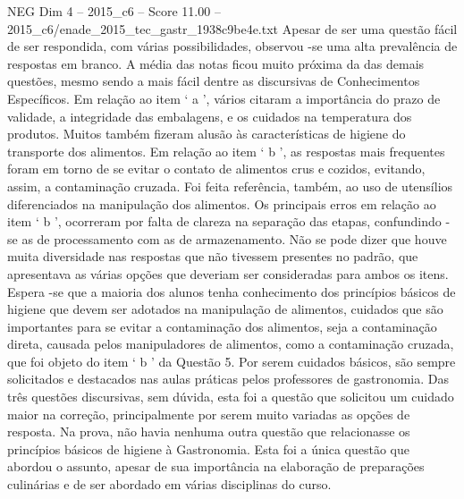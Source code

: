 \begin{textsample}{NEG Dim 4 – 2015\_c6 – Score 11.00 – 2015\_c6/enade\_2015\_tec\_gastr\_1938c9be4e.txt}
Apesar de ser uma questão fácil de ser respondida, com várias possibilidades, observou -se uma alta prevalência de respostas em branco.
A média das notas ficou muito próxima da das demais questões, mesmo sendo a mais fácil dentre as discursivas de Conhecimentos Específicos.
Em relação ao item ‘ a ’, vários citaram a importância do prazo de validade, a integridade das embalagens, e os cuidados na temperatura dos produtos.
Muitos também fizeram alusão às características de higiene do transporte dos alimentos.
Em relação ao item ‘ b ’, as respostas mais frequentes foram em torno de se evitar o contato de alimentos crus e cozidos, evitando, assim, a contaminação cruzada.
Foi feita referência, também, ao uso de utensílios diferenciados na manipulação dos alimentos.
Os principais erros em relação ao item ‘ b ’, ocorreram por falta de clareza na separação das etapas, confundindo -se as de processamento com as de armazenamento.
Não se pode dizer que houve muita diversidade nas respostas que não tivessem presentes no padrão, que apresentava as várias opções que deveriam ser consideradas para ambos os itens.
Espera -se que a maioria dos alunos tenha conhecimento dos princípios básicos de higiene que devem ser adotados na manipulação de alimentos, cuidados que são importantes para se evitar a contaminação dos alimentos, seja a contaminação direta, causada pelos manipuladores de alimentos, como a contaminação cruzada, que foi objeto do item ‘ b ’ da Questão 5.
Por serem cuidados básicos, são sempre solicitados e destacados nas aulas práticas pelos professores de gastronomia.
Das três questões discursivas, sem dúvida, esta foi a questão que solicitou um cuidado maior na correção, principalmente por serem muito variadas as opções de resposta.
Na prova, não havia nenhuma outra questão que relacionasse os princípios básicos de higiene à Gastronomia.
Esta foi a única questão que abordou o assunto, apesar de sua importância na elaboração de preparações culinárias e de ser abordado em várias disciplinas do curso.

\end{textsample}
